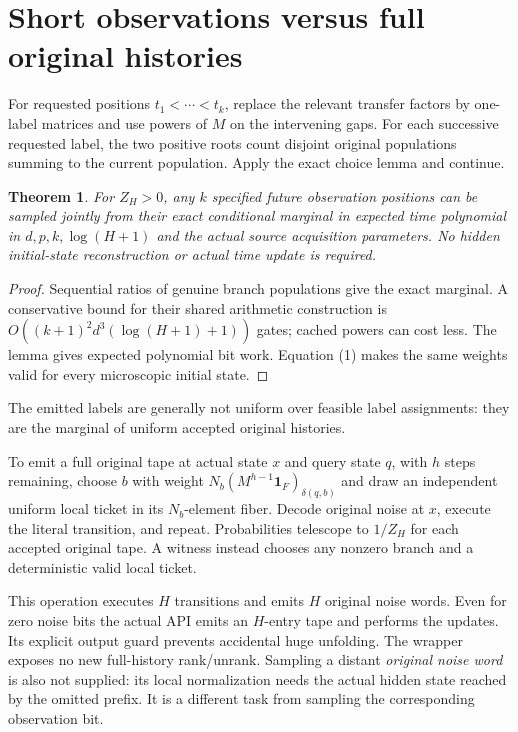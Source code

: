 \documentclass[11pt]{article}
\newtheorem{theorem}{Theorem}\newtheorem{lemma}[theorem]{Lemma}
\begin{document}
\section{Short observations versus full original histories}
For requested positions $t_1<\cdots<t_k$, replace the relevant transfer factors
by one-label matrices and use powers of $M$ on the intervening gaps.
For each successive requested label, the two positive roots count disjoint
original populations summing to the current population. Apply the exact
choice lemma and continue.

\begin{theorem}
For $Z_H>0$, any $k$ specified future observation positions can be sampled
jointly from their exact conditional marginal in expected time polynomial
in $d,p,k,\log(H+1)$ and the actual source acquisition parameters. No hidden
initial-state reconstruction or actual time update is required.
\end{theorem}
\begin{proof}
Sequential ratios of genuine branch populations give the exact marginal.
A conservative bound for their shared arithmetic construction is
$O((k+1)^2d^3(\log(H+1)+1))$ gates; cached powers can cost less.
The lemma gives expected polynomial bit work. Equation (1) makes the same
weights valid for every microscopic initial state.
\end{proof}
The emitted labels are generally not uniform over feasible label assignments:
they are the marginal of uniform accepted original histories.

To emit a full original tape at actual state $x$ and query state $q$, with
$h$ steps remaining, choose $b$ with weight
$N_b(M^{h-1}\mathbf1_F)_{\delta(q,b)}$ and draw an independent uniform local
ticket in its $N_b$-element fiber. Decode original noise at $x$, execute the
literal transition, and repeat. Probabilities telescope to $1/Z_H$ for each
accepted original tape. A witness instead chooses any nonzero branch and a
deterministic valid local ticket.

This operation executes $H$ transitions and emits $H$ original noise words.
Even for zero noise bits the actual API emits an $H$-entry tape and performs
the updates. Its explicit output guard prevents accidental huge unfolding.
The wrapper exposes no new full-history rank/unrank. Sampling a distant
\emph{original noise word} is also not supplied: its local normalization needs
the actual hidden state reached by the omitted prefix. It is a different task
from sampling the corresponding observation bit.
\end{document}
